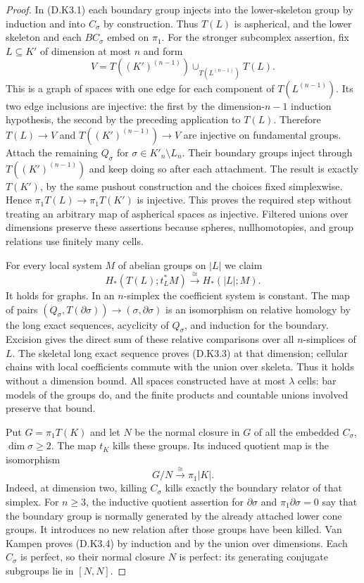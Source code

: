 \begin{proof}
In (D.K3.1) each boundary group injects into the lower-skeleton
group by induction and into $C_\sigma$ by construction. Thus
$T(L)$ is aspherical, and the lower skeleton and each
$BC_\sigma$ embed on $\pi_1$. For the stronger subcomplex
assertion, fix $L\subseteq K'$ of dimension at most $n$ and
form
\[
 V=T((K')^{(n-1)})
       \cup_{T(L^{(n-1)})}T(L).
 \tag{D.K3.2}
\]
This is a graph of spaces with one edge for each component
of $T(L^{(n-1)})$. Its two edge inclusions are injective:
the first by the dimension-$n-1$ induction hypothesis, the
second by the preceding application to $T(L)$. Therefore
$T(L)\to V$ and $T((K')^{(n-1)})\to V$ are injective on
fundamental groups. Attach the remaining $Q_\sigma$ for
$\sigma\in K'_n\setminus L_n$. Their boundary groups inject
through $T((K')^{(n-1)})$ and keep doing so after each
attachment. The result is exactly $T(K')$, by the same
pushout construction and the choices fixed simplexwise.
Hence $\pi_1T(L)\to\pi_1T(K')$ is injective. This proves
the required step without treating an arbitrary map of
aspherical spaces as injective. Filtered unions over
dimensions preserve these assertions because spheres,
nullhomotopies, and group relations use finitely many cells.

For every local system $M$ of abelian groups on $|L|$ we
claim
\[
 H_*(T(L);t_L^*M)\xrightarrow{\cong}H_*(|L|;M).
 \tag{D.K3.3}
\]
It holds for graphs. In an $n$-simplex the coefficient
system is constant. The map of pairs
$(Q_\sigma,T(\partial\sigma))\to(\sigma,\partial\sigma)$
is an isomorphism on relative homology by the long exact
sequences, acyclicity of $Q_\sigma$, and induction for the
boundary. Excision gives the direct sum of these relative
comparisons over all $n$-simplices of $L$. The skeletal
long exact sequence proves (D.K3.3) at that dimension;
cellular chains with local coefficients commute with the
union over skeleta. Thus it holds without a dimension
bound. All spaces constructed have at most $\lambda$
cells: bar models of the groups do, and the finite products
and countable unions involved preserve that bound.

Put $G=\pi_1T(K)$ and let $N$ be the normal closure in $G$
of all the embedded $C_\sigma$, $\dim\sigma\geq2$.
The map $t_K$ kills these groups. Its induced quotient map
is the isomorphism
\[
 G/N\xrightarrow{\cong}\pi_1|K|.
 \tag{D.K3.4}
\]
Indeed, at dimension two, killing $C_\sigma$ kills exactly
the boundary relator of that simplex. For $n\geq3$,
the inductive quotient assertion for $\partial\sigma$
and $\pi_1\partial\sigma=0$ say that the boundary group
is normally generated by the already attached lower
cone groups. It introduces no new relation after those
groups have been killed. Van Kampen proves (D.K3.4) by
induction and by the union over dimensions. Each
$C_\sigma$ is perfect, so their normal closure $N$ is
perfect: its generating conjugate subgroups lie in
$[N,N]$.


\end{proof}
